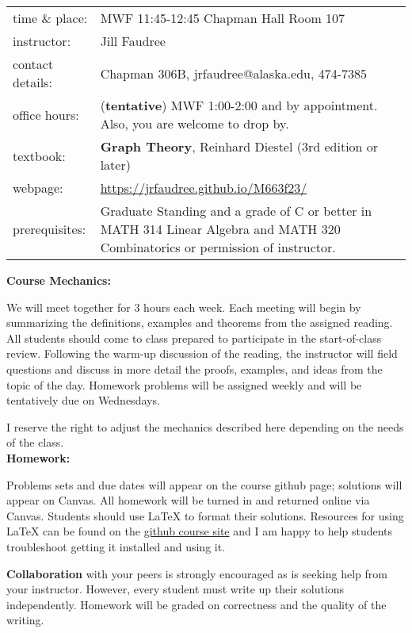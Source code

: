 \documentclass[12pt]{article}
\begin{document}
\begin{tabular}{p{} p{}}
{time \& place}:&MWF 11:45-12:45 Chapman Hall Room 107\\
{instructor:} &Jill Faudree\\
{contact details:} &Chapman 306B, jrfaudree@alaska.edu, 474-7385\\
{office hours:} &(\textbf{tentative})  MWF 1:00-2:00 and by appointment. Also, you are welcome to drop by.\\
{textbook:}& \textbf{Graph Theory}, Reinhard Diestel (3rd edition or later)\\
{webpage:}& \url{https://jrfaudree.github.io/M663f23/}\\
{prerequisites:} &Graduate Standing and a grade of C or better in MATH 314 Linear Algebra and MATH 320 Combinatorics or permission of instructor.
\end{tabular}

\newpage

{\textbf{\large{Course Mechanics}:}}

We will meet together for 3 hours each week. Each meeting will begin by summarizing the definitions, examples and theorems from the assigned reading. All students should come to class prepared to participate in the start-of-class review. Following the warm-up discussion of the reading, the instructor will field questions and discuss in more detail the proofs, examples, and ideas from the topic of the day. Homework problems will be assigned weekly and will be tentatively due on Wednesdays.

I reserve the right to adjust the mechanics described here depending on the needs of the
class.\\

{\textbf{\large{Homework:}}}

Problems sets and due dates will appear on the course github page; solutions will appear on Canvas. All homework will be turned in and returned online via Canvas. Students should use  \LaTeX \: to format their solutions.  Resources for using \LaTeX \: can be found on the  \href{https://jrfaudree.github.io/M663f23/}{github course site} and I am happy to help students troubleshoot getting it installed and using it.

 \textbf{Collaboration} with your peers is strongly encouraged as is seeking help from your instructor. However, every student must write up their solutions independently. Homework will be graded on correctness and the quality of the writing.
\end{document}
